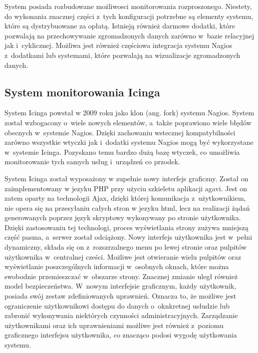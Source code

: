 System posiada rozbudowane możliwosci monitorowania
rozproszonego. Niestety, do wykonania znacznej części z~tych
konfiguracji potrzebne są elementy systemu, które są dystrybuowane za
opłatą. Istnieją również darmowe dodatki, które pozwalają na
przechowywanie zgromadzonych danych zarówno w~bazie relacyjnej jak
i~cyklicznej. Możliwa jest również częściowa integracja systemu Nagios
z~dodatkami lub systemami, które pozwalają na wizualizacje
zgromadzonych danych.

\subsection[Icinga][System monitorowania Icinga]{System monitorowania Icinga}
\label{subsec:Icinga}

System Icinga powstał w 2009 roku jako klon (ang. fork) systemu
Nagios. System został wzbogacony o~wiele nowych elementów, a~także
poprawiono wiele błędów obecnych w~systemie Nagios. Dzięki zachowaniu
wstecznej kompatybilności zarówno wszystkie wtyczki jak i~dodatki
systemu Nagios mogą być wykorzystane w~systemie Icinga. Pozyskano temu
bardzo dużą bazę wtyczek, co umożliwia monitorowanie tych samych usług
i~urządzeń co przodek.

System Icinga został wyposażony w zupełnie nowy interfejs
graficzny. Został on zaimplementowany w jezyku PHP przy użyciu
szkieletu aplikacji agavi. Jest on zatem oparty na technologii Ajax,
dzięki której komunikacja z~użytkownikiem, nie opera się na
przesyłaniu całych stron w jezyku html, lecz na realizacji żądań
generowanych poprzez język skryptowy wykonywany po stronie
użytkownika. Dzięki zastosowaniu tej technologi, proces wyświetlania
strony zużywa mniejszą część pasma, a~serwer został odciążony. Nowy
interfejs użytkownika jest w~pełni dynamiczny, składa się on
z~rozszrzalnego menu po lewej stronie oraz pulpitów użytkownika
w~centralnej cześci. Możliwe jest otwieranie wielu pulpitów oraz
wyświetlanie poszczególnych informacji w~osobnych oknach, które można
swobodnie przemieszczać w~obszarze strony. Znacznej zmianie uległ
również model bezpieczeństwa. W~nowym interfejsie graficznym, każdy
użytkownik, posiada swój zestaw zdefiniowanych uprawnień. Oznacza to,
że możliwe jest ograniczenie użytkownikowi dostępu do danych
o~oknkretnej usłudzie lub zabronić wykonywania niektórych czynności
administracyjnych. Zarządzanie użytkownikami oraz ich uprawnieniami
możliwe jest również z~poziomu graficznego interfejsu użytkownika, co
znacząco podosi wygodę użytkowania systemu.

